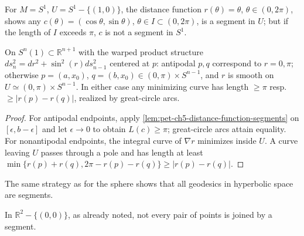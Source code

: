 \begin{example}
  \label{ex:pet-ch5-circle-segment}
  For $M=S^1$, $U=S^1-\{(1,0)\}$, the distance function $r(\theta)=\theta$,
  $\theta\in(0,2\pi)$, shows any $c(\theta)=(\cos\theta,\sin\theta)$, $\theta\in
  I\subset(0,2\pi)$, is a segment in $U$; but if the length of $I$ exceeds $\pi$,
  $c$ is not a segment in $S^1$.
\end{example}

\begin{example}
  \label{ex:pet-ch5-sphere-segments}
  On $S^n(1)\subset\mathbb R^{n+1}$ with the warped product structure
  $ds_n^2=dr^2+\sin^2(r)ds_{n-1}^2$ centered at $p$: antipodal $p,q$ correspond to
  $r=0,\pi$; otherwise $p=(a,x_0)$, $q=(b,x_0)\in(0,\pi)\times S^{n-1}$, and $r$ is
  smooth on $U\simeq(0,\pi)\times S^{n-1}$. In either case any minimizing curve has
  length $\ge\pi$ resp.\ $\ge|r(p)-r(q)|$, realized by great-circle arcs.
\end{example}
\begin{proof}
  \sketch
  For antipodal endpoints, apply \cref{lem:pet-ch5-distance-function-segments} on
  $[\epsilon,b-\epsilon]$ and let $\epsilon\to0$ to obtain $L(c)\ge\pi$;
  great-circle arcs attain equality.  For nonantipodal endpoints, the integral
  curve of $\nabla r$ minimizes inside $U$.  A curve leaving $U$ passes through a
  pole and has length at least
  $\min\{r(p)+r(q),2\pi-r(p)-r(q)\}\ge|r(p)-r(q)|$.
\end{proof}

\begin{example}
  \label{ex:pet-ch5-hyperbolic-segments}
  The same strategy as for the sphere shows that all geodesics in hyperbolic space
  are segments.
\end{example}

\begin{example}
  \label{ex:pet-ch5-punctured-plane-no-segment}
  \leanok
  In $\mathbb R^2-\{(0,0)\}$, as already noted, not every pair of points is joined by
  a segment.
\end{example}

